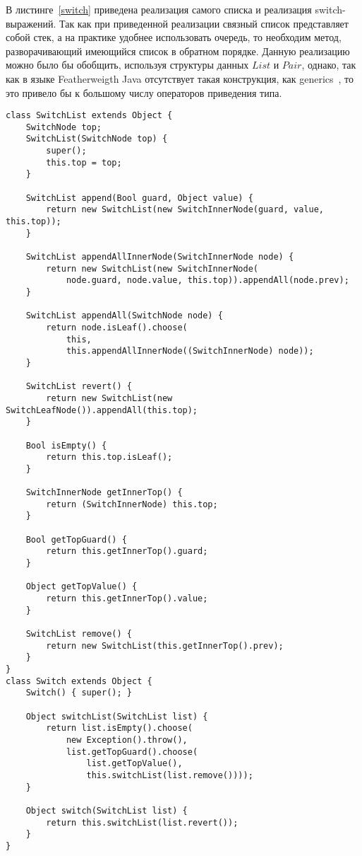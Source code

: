 В листинге~\ref{switch} приведена реализация самого списка и реализация switch-выражений. Так как при приведенной реализации связный список представляет собой стек,
а на практике удобнее использовать очередь, то необходим метод, разворачивающий имеющийся список в обратном порядке.
Данную реализацию можно было бы обобщить, используя структуры данных $List$ и $Pair$, однако,
так как в языке Featherweigth Java отсутствует такая конструкция, как generics~\cite{java},
то это привело бы к большому числу операторов приведения типа.
\begin{lstlisting}[float=htb,label=switch,caption=Определение switch-выражений.]
class SwitchList extends Object {
    SwitchNode top;
    SwitchList(SwitchNode top) {
        super();
        this.top = top;
    }

    SwitchList append(Bool guard, Object value) {
        return new SwitchList(new SwitchInnerNode(guard, value, this.top));
    }

    SwitchList appendAllInnerNode(SwitchInnerNode node) {
        return new SwitchList(new SwitchInnerNode(
            node.guard, node.value, this.top)).appendAll(node.prev);
    }

    SwitchList appendAll(SwitchNode node) {
        return node.isLeaf().choose(
            this,
            this.appendAllInnerNode((SwitchInnerNode) node));
    }

    SwitchList revert() {
        return new SwitchList(new SwitchLeafNode()).appendAll(this.top);
    }

    Bool isEmpty() {
        return this.top.isLeaf();
    }

    SwitchInnerNode getInnerTop() {
        return (SwitchInnerNode) this.top;
    }

    Bool getTopGuard() {
        return this.getInnerTop().guard;
    }

    Object getTopValue() {
        return this.getInnerTop().value;
    }

    SwitchList remove() {
        return new SwitchList(this.getInnerTop().prev);
    }
}
class Switch extends Object {
    Switch() { super(); }

    Object switchList(SwitchList list) {
        return list.isEmpty().choose(
            new Exception().throw(),
            list.getTopGuard().choose(
                list.getTopValue(),
                this.switchList(list.remove())));
    }

    Object switch(SwitchList list) {
        return this.switchList(list.revert());
    }
}
\end{lstlisting}

